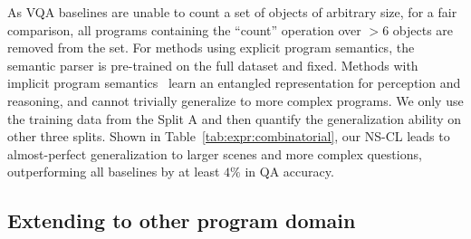 \documentclass{article} \usepackage{iclr2019_conference,times}
\newcommand{\tbl}[1]{Table~\ref{#1}}
\newcommand{\model}{NS-CL\xspace}
\begin{document}
As VQA baselines are unable to count a set of objects of arbitrary size, for a fair comparison, all programs containing the ``count'' operation over $>6$ objects are removed from the set. For methods using explicit program semantics, the semantic parser is pre-trained on the full dataset and fixed. Methods with implicit program semantics~\citep{Hudson2018Compositional} learn an entangled representation for perception and reasoning, and cannot trivially generalize to more complex programs. We only use the training data from the Split A and then quantify the generalization ability on other three splits. Shown in \tbl{tab:expr:combinatorial}, our \model leads to almost-perfect generalization to larger scenes and more complex questions, outperforming all baselines by at least $4\%$ in QA accuracy. 


\subsection{Extending to other program domain}
\end{document}
